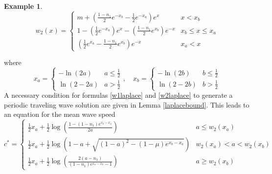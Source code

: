 \documentclass[11pt]{article}
\theoremstyle{definition}
\newtheorem{ex}[thm]{Example}
\numberwithin{equation}{section}
\numberwithin{thm}{section}
\renewcommand{\a}{a}
\renewcommand{\b}{b}
\newcommand{\m}{n_1}
\begin{document}
\begin{ex}
\begin{equation} \label{w2laplace}
w_2(x) = \begin{cases}
m + \left( \frac{1-\m}{2}e^{-x_\b} - \frac{1}{2}e^{-x_\a} \right) e^x & x < x_\b \\
1 - \left( \frac{1}{2} e^{-x_\a} \right) e^x - \left( \frac{1-\m}{2} e^{x_\b} \right)  e^{-x} & x_\b \leq x \leq x_\a \\
\left( \frac{1}{2} e^{x_\a} - \frac{1-\m}{2} e^{x_\b} \right) e^{-x} & x_\a < x 
\end{cases} \end{equation}

where
\begin{equation}
x_\a = \begin{cases} -\ln(2\a) & \a\leq \frac{1}{2} \\ \ln(2-2\a) & \a > \frac{1}{2} \end{cases}, \quad
x_\b = \begin{cases} -\ln(2\b) & \b\leq \frac{1}{2} \\ \ln(2-2\b) & \b > \frac{1}{2} \end{cases} 
\end{equation}
A necessary condition for formulas \eqref{w1laplace} and \eqref{w2laplace} to generate a periodic traveling wave solution are given in Lemma \ref{laplacebound}. This leads to an equation for the mean wave speed
\begin{equation}
c^* = \begin{cases}
\frac{1}{2}x_\a  + \frac{1}{2}\log \left( \frac{1 - (1-\m) e^{x_\b-x_\a}}{2\a} \right) & \a \leq w_2(x_\a) \\
\frac{1}{2}x_\a + \frac{1}{2} \log \left( 1-\a + \sqrt{(1-\a)^2 - (1-\mu) e^{x_\b-x_\a}} \right) & w_2(x_\a) < \a < w_2(x_\b) \\
\frac{1}{2}x_\a + \frac{1}{2} \log \left( \frac{2(\a-\m)}{(1-\m)e^{x_\a-x_\b}-1} \right) & \a \geq w_2(x_\b)
\end{cases} 
\end{equation}
%

\end{ex}
\end{document}
